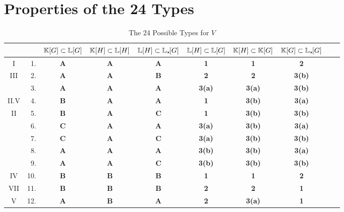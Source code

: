 \chapter{Properties of the 24 Types}\label{chapter:tablesfor24ways}

\begin{table}[h!] %
     \vspace{1cm}
\centering
\bgroup
\caption{The 24 Possible Types for $V$}
\label{tab:24types}
\def\arraystretch{1.1}
\begin{tabular}{c r c  c  c  c  c  c c c}
    \toprule
    & &  ${\mathbb K}[G] \subset {\mathbb L}[G]$ & ${\mathbb K}[H] \subset {\mathbb L}[H]$ & ${\mathbb L}[H] \subset {\mathbb L}_{\star \hspace{-0.1em}}[G]$ & ${\mathbb L}[H] \subset {\mathbb L}[G]$ & ${\mathbb K}[H] \subset {\mathbb K}[G]$ & ${\mathbb K}[G] \subset {\mathbb L}_{\star \hspace{-0.1em}}[G]$ \\
    \midrule
I & 1.  &  \textbf{A} & \textbf{A} & \textbf{A} & \textbf{1} & \textbf{1} & \textbf{2}  \\ 
III & 2.  &  \textbf{A} & \textbf{A} & \textbf{B} & \textbf{2} & \textbf{2} & \textbf{3(b)}  \\
& 3.  &  \textbf{A} & \textbf{A} & \textbf{A} & \textbf{3(a)} & \textbf{3(a)} & \textbf{3(b)}  \\
II.V & 4.  &  \textbf{B} & \textbf{A} & \textbf{A} & \textbf{1} & \textbf{3(b)} & \textbf{3(a)}  \\
II & 5.  &  \textbf{B} & \textbf{A} & \textbf{C} & \textbf{1} & \textbf{3(b)} & \textbf{3(b)}  \\
& 6.  &  \textbf{C} & \textbf{A} & \textbf{A} & \textbf{3(a)} & \textbf{3(b)} & \textbf{3(a)}  \\
& 7.  &  \textbf{C} & \textbf{A} & \textbf{C} & \textbf{3(a)} & \textbf{3(b)} & \textbf{3(b)}  \\ 
& 8.  &  \textbf{A} & \textbf{A} & \textbf{A} & \textbf{3(b)} & \textbf{3(b)} & \textbf{3(a)}  \\
& 9.  &  \textbf{A} & \textbf{A} & \textbf{C} & \textbf{3(b)} & \textbf{3(b)} & \textbf{3(b)}  \\
IV & 10. &  \textbf{B} & \textbf{B} & \textbf{B} & \textbf{1} & \textbf{1} & \textbf{2}  \\ 
VII & 11. &  \textbf{B} & \textbf{B} & \textbf{B} & \textbf{2} & \textbf{2} & \textbf{1}  \\ 
V & 12. &  \textbf{A} & \textbf{B} & \textbf{A} & \textbf{2} & \textbf{3(a)} & \textbf{1}  \\ 

\end{tabular}
\end{table}

